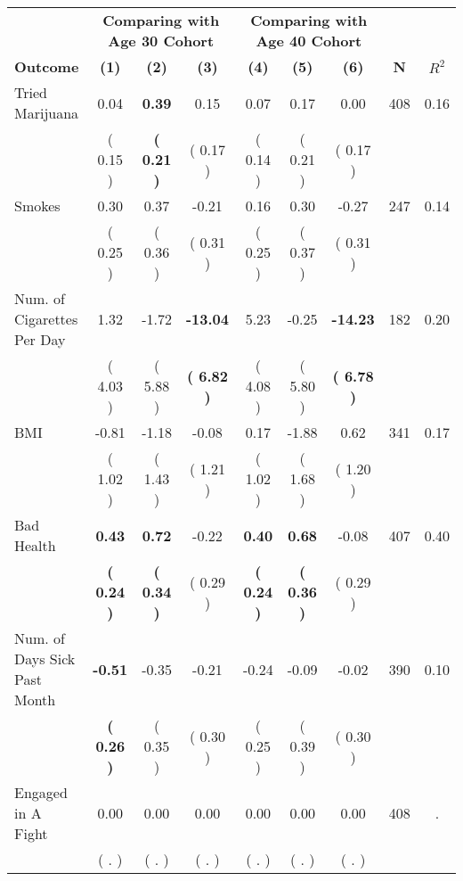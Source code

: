 \begin{tabular}{lcccccccc}
\toprule
 & \multicolumn{3}{c}{\textbf{Comparing with Age 30 Cohort}} & \multicolumn{3}{c}{\textbf{Comparing with Age 40 Cohort}} & \\
\cmidrule(lr){2-4} \cmidrule(lr){5-7} 
 \textbf{Outcome} & \textbf{(1)} & \textbf{(2)} & \textbf{(3)} & \textbf{(4)} & \textbf{(5)} & \textbf{(6)} & \textbf{N} & \textbf{$ R^2$} \\
\midrule
Tried Marijuana &      0.04 & \textbf{     0.39} &      0.15 &      0.07 &      0.17 &      0.00 & 408 &       0.16 \\ 
 & (     0.15 ) & \textbf{(     0.21 )} & (     0.17 ) & (     0.14 ) & (     0.21 ) & (     0.17 ) & \\
Smokes &      0.30 &      0.37 &     -0.21 &      0.16 &      0.30 &     -0.27 & 247 &       0.14 \\ 
 & (     0.25 ) & (     0.36 ) & (     0.31 ) & (     0.25 ) & (     0.37 ) & (     0.31 ) & \\
Num. of Cigarettes Per Day &      1.32 &     -1.72 & \textbf{   -13.04} &      5.23 &     -0.25 & \textbf{   -14.23} & 182 &       0.20 \\ 
 & (     4.03 ) & (     5.88 ) & \textbf{(     6.82 )} & (     4.08 ) & (     5.80 ) & \textbf{(     6.78 )} & \\
BMI &     -0.81 &     -1.18 &     -0.08 &      0.17 &     -1.88 &      0.62 & 341 &       0.17 \\ 
 & (     1.02 ) & (     1.43 ) & (     1.21 ) & (     1.02 ) & (     1.68 ) & (     1.20 ) & \\
Bad Health & \textbf{     0.43} & \textbf{     0.72} &     -0.22 & \textbf{     0.40} & \textbf{     0.68} &     -0.08 & 407 &       0.40 \\ 
 & \textbf{(     0.24 )} & \textbf{(     0.34 )} & (     0.29 ) & \textbf{(     0.24 )} & \textbf{(     0.36 )} & (     0.29 ) & \\
Num. of Days Sick Past Month & \textbf{    -0.51} &     -0.35 &     -0.21 &     -0.24 &     -0.09 &     -0.02 & 390 &       0.10 \\ 
 & \textbf{(     0.26 )} & (     0.35 ) & (     0.30 ) & (     0.25 ) & (     0.39 ) & (     0.30 ) & \\
Engaged in A Fight &      0.00 &      0.00 &      0.00 &      0.00 &      0.00 &      0.00 & 408 &          . \\ 
 & (        . ) & (        . ) & (        . ) & (        . ) & (        . ) & (        . ) & \\

\end{tabular}

